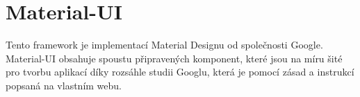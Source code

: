 \section{Material-UI}

Tento framework je implementací Material Designu od společnosti Google. Material-UI obsahuje spoustu připravených komponent, které jsou na míru šité pro tvorbu aplikací díky rozsáhle studii Googlu, která je pomocí zásad a instrukcí popsaná na vlastním webu.

